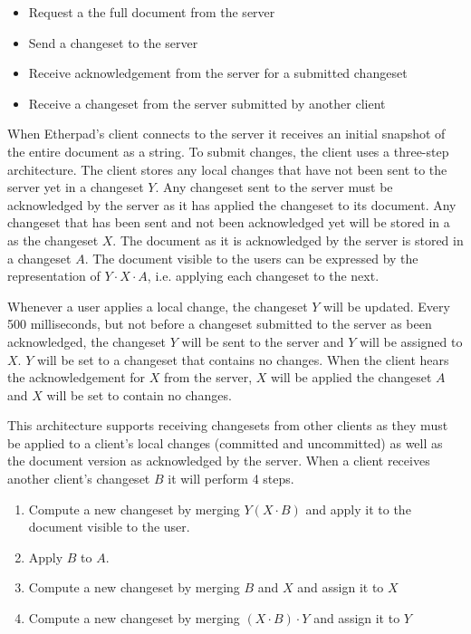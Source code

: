 \begin{itemize}
\item Request a the full document from the server
\item Send a changeset to the server
\item Receive acknowledgement from the server for a submitted changeset
\item Receive a changeset from the server submitted by another client
\end{itemize}

\noindent When Etherpad's client connects to the server it receives an initial snapshot of the entire document as a string. To submit changes, the client uses a three-step architecture. The client stores any local changes that have not been sent to the server yet in a changeset $Y$. Any changeset sent to the server must be acknowledged by the server as it has applied  the changeset to its document. Any changeset that has been sent and not been acknowledged yet will be stored in a as the changeset $X$. The document as it is acknowledged by the server is stored in a changeset $A$. The document visible to the users can be expressed by the representation of $Y \cdot X \cdot A$, i.e. applying each changeset to the next.

Whenever a user applies a local change, the changeset $Y$ will be updated. Every 500 milliseconds, but not before a changeset submitted to the server as been acknowledged, the changeset $Y$ will be sent to the server and $Y$ will be assigned to $X$. $Y$ will be set to a changeset that contains no changes. When the client hears the acknowledgement for $X$ from the server, $X$ will be applied the changeset $A$ and $X$ will be set to contain no changes.

This architecture supports receiving changesets from other clients as they must be applied to a client's local changes (committed and uncommitted) as well as the document version as acknowledged by the server. When a client receives another client's changeset $B$ it will perform 4 steps.

\begin{enumerate}
\item Compute a new changeset by merging $Y (X \cdot B)$ and apply it to the document visible to the user.
\item Apply $B$ to $A$.
\item Compute a new changeset by merging $B$ and $X$ and assign it to $X$
\item Compute a new changeset by merging $(X \cdot B) \cdot Y$ and assign it to $Y$
\end{enumerate}


